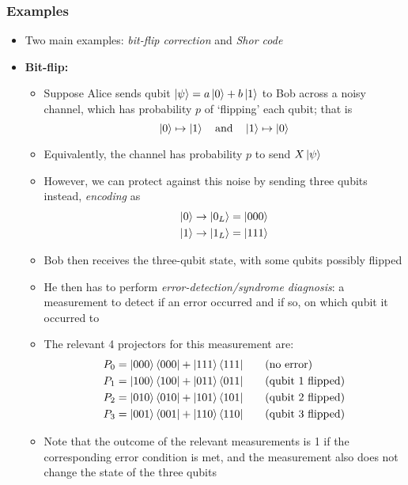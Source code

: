 \documentclass[12pt,a4paper]{article}
\numberwithin{equation}{section}
\newcommand{\ketbra}[2]{\ket{#1}\bra{#2}}
\newcommand{\ketbras}[1]{\ketbra{#1}{#1}}
\begin{document}
	\subsubsection{Examples}
	\begin{itemize}
		\item Two main examples: \textit{bit-flip correction} and \textit{Shor code}
		\item \textbf{Bit-flip:}
		\begin{itemize}
			\item Suppose Alice sends qubit $\ket{\psi}=a\ket{0}+b\ket{1}$ to Bob across a noisy channel, which has probability $p$ of `flipping' each qubit; that is
			$$
				\ket{0}\mapsto\ket{1}\quad\text{and}\quad\ket{1}\mapsto\ket{0}
			$$
			\item Equivalently, the channel has probability $p$ to send $X\ket{\psi}$
			\item However, we can protect against this noise by sending three qubits instead, \textit{encoding} as
			\begin{equation}
				\begin{aligned}
					\ket{0}&\to\ket{0_{L}}=\ket{000}\\
					\ket{1}&\to\ket{1_{L}}=\ket{111}
				\end{aligned}
			\end{equation}
			\item Bob then receives the three-qubit state, with some qubits possibly flipped
			\item He then has to perform \textit{error-detection/syndrome diagnosis}: a measurement to detect if an error occurred and if so, on which qubit it occurred to
			\item The relevant 4 projectors for this measurement are:
			\begin{equation}
				\begin{aligned}
					P_{0}&=\ketbras{000}+\ketbras{111}&\quad&\text{(no error)}\\
					P_{1}&=\ketbras{100}+\ketbras{011}&\quad&\text{(qubit 1 flipped)}\\
					P_{2}&=\ketbras{010}+\ketbras{101}&\quad&\text{(qubit 2 flipped)}\\
					P_{3}&=\ketbras{001}+\ketbras{110}&\quad&\text{(qubit 3 flipped)}
				\end{aligned}
			\end{equation}
			\item Note that the outcome of the relevant measurements is 1 if the corresponding error condition is met, and the measurement also does not change the state of the three qubits

\end{itemize}
\end{itemize}
\end{document}
